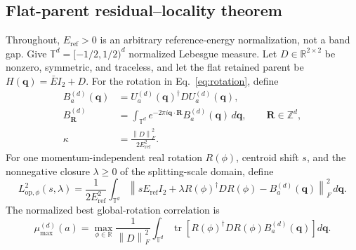 \documentclass[11pt]{article}
\newcommand{\Z}{\mathbb Z}
\newcommand{\T}{\mathbb T}
\newcommand{\norm}[1]{\left\lVert #1\right\rVert}
\begin{document}
\subsection{Flat-parent residual--locality theorem}

Throughout, $E_{\mathrm{ref}}>0$ is an arbitrary reference-energy normalization, not a
band gap. Give $\T^d=[-1/2,1/2)^d$ normalized Lebesgue measure. Let
$D\in\mathbb R^{2\times2}$ be nonzero, symmetric, and traceless, and let the flat
retained parent be $H(\mathbf q)=\bar E I_2+D$. For the rotation in
Eq.~\eqref{eq:rotation}, define
\begin{align}
 B_a^{(d)}(\mathbf q)
 &=U_a^{(d)}(\mathbf q)^\dagger D U_a^{(d)}(\mathbf q),\\
 B_{\mathbf R}^{(d)}
 &=\int_{\T^d}e^{-2\pi i\mathbf q\cdot\mathbf R}
 B_a^{(d)}(\mathbf q)\,d\mathbf q,
 \qquad \mathbf R\in\Z^d,\\
 \kappa&=\frac{\norm{D}_F^2}{2E_{\mathrm{ref}}^2}.
 \label{eq:flat-definitions}
\end{align}
For one momentum-independent real rotation $R(\phi)$, centroid shift $s$, and the
nonnegative closure $\lambda\ge0$ of the splitting-scale domain, define
\begin{equation}
 L_{\mathrm{op},\phi}^2(s,\lambda)
 =\frac{1}{2E_{\mathrm{ref}}^2}\int_{\T^d}
 \norm{sE_{\mathrm{ref}}I_2+\lambda R(\phi)^\dagger D R(\phi)
       -B_a^{(d)}(\mathbf q)}_F^2\,d\mathbf q.
 \label{eq:flat-operator-loss}
\end{equation}
The normalized best global-rotation correlation is
\begin{equation}
 \mu_{\max}^{(d)}(a)=
 \max_{\phi\in\mathbb R}
 \frac{1}{\norm D_F^2}
 \int_{\T^d}
 \operatorname{tr}\!\left[
   R(\phi)^\dagger D R(\phi)B_a^{(d)}(\mathbf q)
 \right]d\mathbf q.
 \label{eq:flat-mu-definition}
\end{equation}
\end{document}
